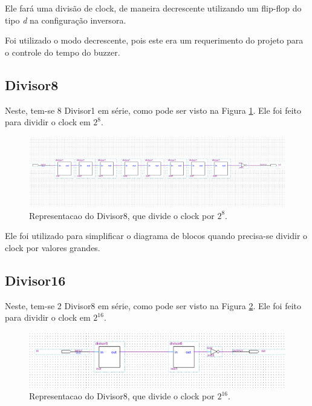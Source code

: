 Ele fará uma divisão de clock, de maneira decrescente utilizando um flip-flop do tipo \emph{d} na configuração inversora.

Foi utilizado o modo decrescente, pois este era um requerimento do projeto para o controle do tempo do buzzer.

\subsection{Divisor8}

Neste, tem-se 8 Divisor1 em série, como pode ser visto na Figura \ref{fig:2.5}. Ele foi feito para dividir o clock em $2^8$.

\begin{figure}[H]
	\centering
	\includegraphics[width=1\columnwidth]{FIGURAS/cap_2/divisor8.png}
	\caption{Representacao do Divisor8, que divide o clock por $2^8$.}
        \label{fig:2.5}
\end{figure}

Ele foi utilizado para simplificar o diagrama de blocos quando precisa-se  dividir o clock por valores grandes.



\subsection{Divisor16}

Neste, tem-se 2 Divisor8 em série, como pode ser visto na Figura \ref{fig:2.6}. Ele foi feito para dividir o clock em $2^{16}$.

\begin{figure}[H]
	\centering
	\includegraphics[width=1\columnwidth]{FIGURAS/cap_2/divisor16.png}
	\caption{Representacao do Divisor8, que divide o clock por $2^{16}$.}
        \label{fig:2.6}
\end{figure}


